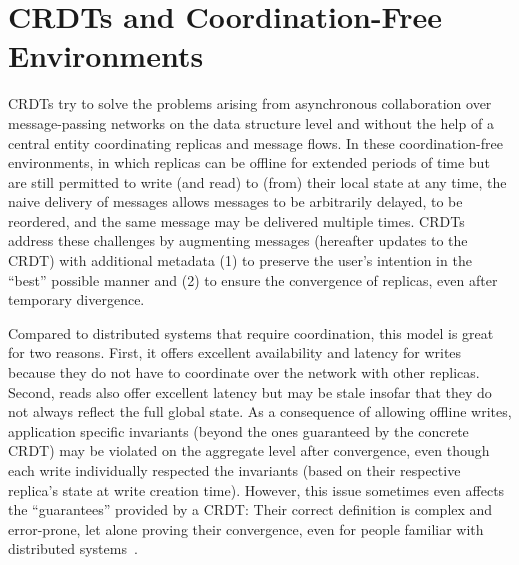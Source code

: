 

\section{\acsp{CRDT} and Coordination-Free Environments}

\acfp{CRDT}\footnotemark{} try to solve the problems arising from asynchronous
collaboration over message-passing networks on the data structure level and
without the help of a central entity coordinating replicas and message flows.
In these coordination-free environments, in which replicas can be offline
for extended periods of time but are still permitted to write (and read)
to (from) their local state at any time,
the naive delivery of messages allows messages to be arbitrarily delayed,
to be reordered, and the same message may be delivered multiple times.
\acp{CRDT} address these challenges by augmenting messages (hereafter updates
to the \ac{CRDT}) with additional metadata (1) to preserve the user's intention
in the ``best'' possible manner and (2) to ensure the convergence of replicas,
even after temporary divergence.


Compared to distributed systems that require coordination,
this model is great for two reasons.
First, it offers excellent availability and latency for writes because
they do not have to coordinate over the network with other replicas.
Second, reads also offer excellent latency but may be stale insofar that they
do not always reflect the full global state.
As a consequence of allowing offline writes,
application specific invariants (beyond the ones guaranteed by the concrete \ac{CRDT})
may be violated on the aggregate level after convergence,
even though each write individually respected the invariants (based on their
respective replica's state at write creation time).
However, this issue sometimes even affects the ``guarantees'' provided by a \ac{CRDT}:
Their correct definition is complex and error-prone,
let alone proving their convergence, even for people familiar with distributed
systems~\cite{kleppmann2022assessing, gomes2017verifying}.

